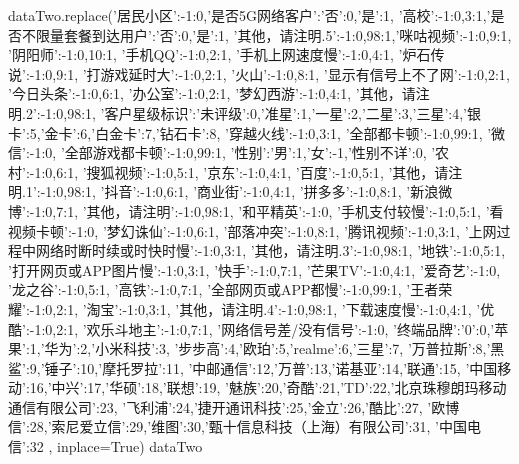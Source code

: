 \documentclass{MathorCupmodeling}
\begin{document}
\begin{python}
dataTwo.replace({'居民小区':{-1:0},'是否5G网络客户':{'否':0,'是':1},
                 '高校':{-1:0,3:1},'是否不限量套餐到达用户':{'否':0,'是':1},
                 '其他，请注明.5':{-1:0,98:1},'咪咕视频':{-1:0,9:1},
                 '阴阳师':{-1:0,10:1},
                 '手机QQ':{-1:0,2:1},
                 '手机上网速度慢':{-1:0,4:1},
                 '炉石传说':{-1:0,9:1},
                 '打游戏延时大':{-1:0,2:1},
                 '火山':{-1:0,8:1},
                 '显示有信号上不了网':{-1:0,2:1},
                 '今日头条':{-1:0,6:1},
                 '办公室':{-1:0,2:1},
                 '梦幻西游':{-1:0,4:1},
                 '其他，请注明.2':{-1:0,98:1},
                 '客户星级标识':{'未评级':0,'准星':1,'一星':2,'二星':3,'三星':4,'银卡':5,'金卡':6,'白金卡':7,'钻石卡':8},
                 '穿越火线':{-1:0,3:1},
                 '全部都卡顿':{-1:0,99:1},
                 '微信':{-1:0},
                 '全部游戏都卡顿':{-1:0,99:1},
                 '性别':{'男':1,'女':-1,'性别不详':0},
                 '农村':{-1:0,6:1},
                 '搜狐视频':{-1:0,5:1},
                 '京东':{-1:0,4:1},
                 '百度':{-1:0,5:1},
                 '其他，请注明.1':{-1:0,98:1},
                 '抖音':{-1:0,6:1},
                 '商业街':{-1:0,4:1},
                 '拼多多':{-1:0,8:1},
                 '新浪微博':{-1:0,7:1},
                 '其他，请注明':{-1:0,98:1},
                 '和平精英':{-1:0},
                 '手机支付较慢':{-1:0,5:1},
                 '看视频卡顿':{-1:0},
                 '梦幻诛仙':{-1:0,6:1},
                 '部落冲突':{-1:0,8:1},
                 '腾讯视频':{-1:0,3:1},
                 '上网过程中网络时断时续或时快时慢':{-1:0,3:1},
                 '其他，请注明.3':{-1:0,98:1},
                 '地铁':{-1:0,5:1},
                 '打开网页或APP图片慢':{-1:0,3:1},
                 '快手':{-1:0,7:1},
                 '芒果TV':{-1:0,4:1},
                 '爱奇艺':{-1:0},
                 '龙之谷':{-1:0,5:1},
                 '高铁':{-1:0,7:1},
                 '全部网页或APP都慢':{-1:0,99:1},
                 '王者荣耀':{-1:0,2:1},
                 '淘宝':{-1:0,3:1},
                 '其他，请注明.4':{-1:0,98:1},
                 '下载速度慢':{-1:0,4:1},
                 '优酷':{-1:0,2:1},
                 '欢乐斗地主':{-1:0,7:1},
                 '网络信号差/没有信号':{-1:0},
                 '终端品牌':{'0':0,'苹果':1,'华为':2,'小米科技':3,
                            '步步高':4,'欧珀':5,'realme':6,'三星':7,
                            '万普拉斯':8,'黑鲨':9,'锤子':10,'摩托罗拉':11,
                            '中邮通信':12,'万普':13,'诺基亚':14,'联通':15,
                            '中国移动':16,'中兴':17,'华硕':18,'联想':19,
                            '魅族':20,'奇酷':21,'TD':22,'北京珠穆朗玛移动通信有限公司':23,
                            '飞利浦':24,'捷开通讯科技':25,'金立':26,'酷比':27,
                            '欧博信':28,'索尼爱立信':29,'维图':30,'甄十信息科技（上海）有限公司':31,
                            '中国电信':32}
                 }, inplace=True)
dataTwo



\end{python}
\end{document}
